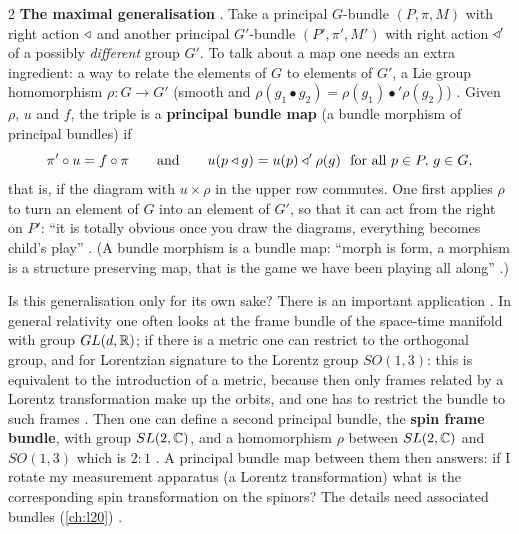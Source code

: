 \begin{paracol}{2}
\textbf{The maximal generalisation} . Take a principal $G$-bundle $(P,\pi,M)$ with right action $\mathbin{\triangleleft}$ and another principal $G'$-bundle $(P',\pi',M')$ with right action $\mathbin{\triangleleft}'$ of a possibly \emph{different} group $G'$. To talk about a map one needs an extra ingredient: a way to relate the elements of $G$ to elements of $G'$, a Lie group homomorphism $\rho\colon G\to G'$ (smooth and $\rho(g_1\bullet g_2)=\rho(g_1)\bullet'\rho(g_2)$)     . Given $\rho$, $u$ and $f$, the triple is a \textbf{principal bundle map} (a bundle morphism of principal bundles) if
\[
  \pi'\circ u=f\circ\pi\qquad\text{and}\qquad u(p\ract g)=u(p)\ract'\rho(g)\ \ \text{for all }p\in P,\,g\in G ,
\]
that is, if the diagram with $u\times\rho$ in the upper row commutes. One first applies $\rho$ to turn an element of $G$ into an element of $G'$, so that it can act from the right on $P'$: ``it is totally obvious once you draw the diagrams, everything becomes child's play''      . (A bundle morphism is a bundle map: ``morph is form, a morphism is a structure preserving map, that is the game we have been playing all along'' .)

\begin{application}
Is this generalisation only for its own sake? There is an important application  . In general relativity one often looks at the frame bundle of the space-time manifold with group $GL(d,\mathbb{R})$; if there is a metric one can restrict to the orthogonal group, and for Lorentzian signature to the Lorentz group $SO(1,3)$: this is equivalent to the introduction of a metric, because then only frames related by a Lorentz transformation make up the orbits, and one has to restrict the bundle to such frames    . Then one can define a second principal bundle, the \textbf{spin frame bundle}, with group $SL(2,\mathbb{C})$, and a homomorphism $\rho$ between $SL(2,\mathbb{C})$ and $SO(1,3)$ which is $2\!:\!1$   . A principal bundle map between them then answers: if I rotate my measurement apparatus (a Lorentz transformation) what is the corresponding spin transformation on the spinors? The details need associated bundles (\cref{ch:l20})  .


\end{application}
\end{paracol}

